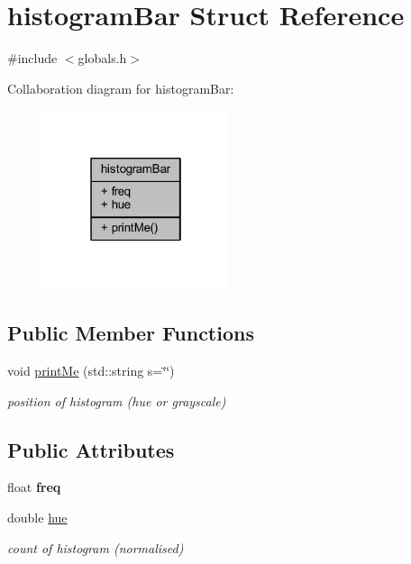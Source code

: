 \hypertarget{structhistogram_bar}{}\section{histogram\+Bar Struct Reference}
\label{structhistogram_bar}


{\ttfamily \#include $<$globals.\+h$>$}



Collaboration diagram for histogram\+Bar\+:
\nopagebreak
\begin{figure}[H]
\begin{center}
\leavevmode
\includegraphics[width=154pt]{structhistogram_bar__coll__graph}
\end{center}
\end{figure}
\subsection*{Public Member Functions}
\begin{DoxyCompactItemize}
\item 
\mbox{\label{structhistogram_bar_a8202ebe23bca4d5f765a9af5947f6a3c}} 
void \hyperlink{structhistogram_bar_a8202ebe23bca4d5f765a9af5947f6a3c}{print\+Me} (std\+::string s=\char`\"{}\char`\"{})
\begin{DoxyCompactList}\small\item\em position of histogram (hue or grayscale) \end{DoxyCompactList}\end{DoxyCompactItemize}
\subsection*{Public Attributes}
\begin{DoxyCompactItemize}
\item 
\mbox{\label{structhistogram_bar_aabef82c0a6adc7d9e999f4da203cf97c}} 
float {\bfseries freq}
\item 
\mbox{\label{structhistogram_bar_a39a1bed319d0844a832dc30852caaeda}} 
double \hyperlink{structhistogram_bar_a39a1bed319d0844a832dc30852caaeda}{hue}
\begin{DoxyCompactList}\small\item\em count of histogram (normalised) \end{DoxyCompactList}\end{DoxyCompactItemize}


